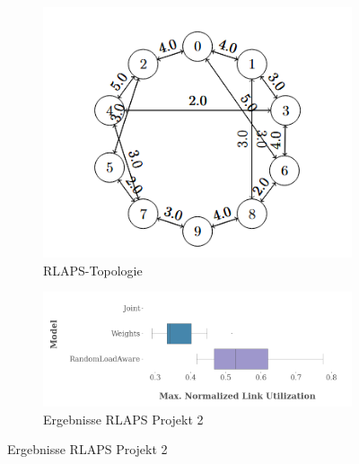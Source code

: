 \documentclass[sigconf,nonacm,review,language=english,language=german]{acmart}
\begin{document}
            \begin{figure}[h]
                \centering
                \begin{subfigure}[c]{0.34\textwidth}
                    \centering
                    \includegraphics[width=1\linewidth]{Grafiken/projekt2/Topologie RLAPS.png}
                    \caption{RLAPS-Topologie}
                    \label{fig:ergebnisse_projekt_2_rlaps_topologie}
                \end{subfigure}
                \begin{subfigure}[c]{0.64\textwidth}
                    \centering
                    \includegraphics[width=1\linewidth]{Grafiken/projekt2/results_compare_rla.png}
                    \caption{Ergebnisse RLAPS Projekt 2}
                    \label{fig:ergebnisse_projekt_2_rlaps_ergebnisse}
                \end{subfigure}
                \caption{Ergebnisse RLAPS Projekt 2}
                \label{fig:ergebnisse_projekt_2_rlaps}
            \end{figure}
            
\end{document}
